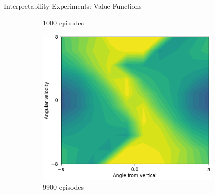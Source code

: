 \documentclass{beamer}
\begin{document}
\begin{frame}{Interpretability Experiments: Value Functions}
\begin{figure}[t]
\begin{subfigure}{0.30\linewidth}
      \caption{1000 episodes}
    \end{subfigure}
    \begin{subfigure}{0.30\linewidth}
      \centering
      \includegraphics[width=0.9\linewidth,trim=0 0 0 0,clip]{assets/ref_plots/value_model_refcolexps_r10c10_1_ep9900}
      \caption{9900 episodes}
    \end{subfigure}
    \begin{subfigure}{0.05\linewidth}
      \vspace{-2em}
      \centering

\end{subfigure}
\end{figure}
\end{frame}
\end{document}

